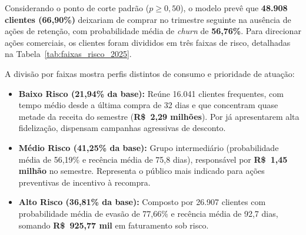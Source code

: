 Considerando o ponto de corte padrão ($p \ge 0,50$), o modelo prevê que \textbf{48.908 clientes (66,90\%)} deixariam de comprar no trimestre seguinte na ausência de ações de retenção, com probabilidade média de \textit{churn} de \textbf{56,76\%}. Para direcionar ações comerciais, os clientes foram divididos em três faixas de risco, detalhadas na Tabela~\ref{tab:faixas_risco_2025}.

\begin{table}[H]
\centering
\caption{Distribuição dos clientes ativos em \texttt{01/01/2025} por faixa de risco de \textit{churn}}
\label{tab:faixas_risco_2025}
\end{table}

A divisão por faixas mostra perfis distintos de consumo e prioridade de atuação:
\begin{itemize}[leftmargin=*]
    \item \textbf{Baixo Risco (21,94\% da base):} Reúne 16.041 clientes frequentes, com tempo médio desde a última compra de 32 dias e que concentram quase metade da receita do semestre (\textbf{R\$~2,29 milhões}). Por já apresentarem alta fidelização, dispensam campanhas agressivas de desconto.
    \item \textbf{Médio Risco (41,25\% da base):} Grupo intermediário (probabilidade média de 56,19\% e recência média de 75,8 dias), responsável por \textbf{R\$~1,45 milhão} no semestre. Representa o público mais indicado para ações preventivas de incentivo à recompra.
    \item \textbf{Alto Risco (36,81\% da base):} Composto por 26.907 clientes com probabilidade média de evasão de 77,66\% e recência média de 92,7 dias, somando \textbf{R\$~925,77 mil} em faturamento sob risco.
\end{itemize}

